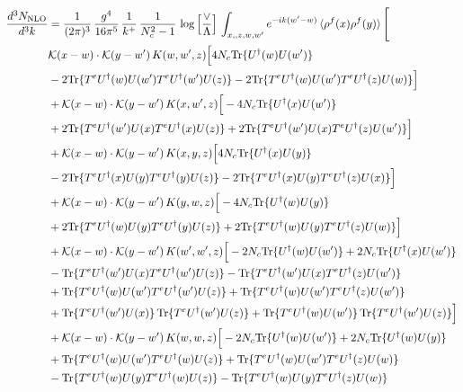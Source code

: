 \documentclass[9pt]{article}
\numberwithin{equation}{section}
\begin{document}
\begin{align}
    \frac{d^{3}N_{\mathrm{NLO}}}{d^{3}k} & = \frac{1}{(2\pi)^{3}}\,\frac{g^{4}}{16\pi^{5}}\,\frac{1}{k^{+}}\,\frac{1}{N^{2}_{c}-1}\,\log\Big[\frac{\vee}{\Lambda}\Big]\,\int_{x,,z,w,w'}e^{-ik(w'-w)}\,\langle\rho^{f}(x)\rho^{f}(y) \rangle\,\Bigg[\notag \\ & \mathcal K(x-w)\cdot\mathcal K(y-w')\,K(w,w',z)\Big[4 N_{c}{\rm Tr}\{U^\dagger(w)U(w')\}\notag\\
&-2{\rm Tr}\{T^eU^\dagger(w)U(w')T^eU^\dagger(w')U(z)\}-2{\rm Tr}\{T^eU^\dagger(w)U(w')T^eU^\dagger(z)U(w)\}\Big]\notag\\
&+\mathcal K(x-w)\cdot\mathcal K(y-w')\,K(x,w',z)\Big[-4 N_{c}{\rm Tr}\{U^\dagger(x)U(w')\}\notag\\
&+2{\rm Tr}\{T^eU^\dagger(w')U(x)T^eU^\dagger(x)U(z)\}+2{\rm Tr}\{T^eU^\dagger(w')U(x)T^eU^\dagger(z)U(w')\}\Big]\notag\\
&+\mathcal K(x-w)\cdot\mathcal K(y-w')\,K(x,y,z)\Big[4 N_{c}{\rm Tr}\{U^\dagger(x)U(y)\}\notag\\
&-2{\rm Tr}\{T^eU^\dagger(x)U(y)T^eU^\dagger(y)U(z)\}-2{\rm Tr}\{T^eU^\dagger(x)U(y)T^eU^\dagger(z)U(x)\}\Big]\notag\\
&+\mathcal K(x-w)\cdot\mathcal K(y-w')\,K(y,w,z)\Big[-4 N_{c}{\rm Tr}\{U^\dagger(w)U(y)\}\notag\\
&+2{\rm Tr}\{T^eU^\dagger(w)U(y)T^eU^\dagger(y)U(z)\}+2{\rm Tr}\{T^eU^\dagger(w)U(y)T^eU^\dagger(z)U(w)\}\Big]\notag\\
&+\mathcal K(x-w)\cdot\mathcal K(y-w')\,K(w',w',z)\Big[-2 N_{c}{\rm Tr}\{U^\dagger(w)U(w')\}+2 N_{c}{\rm Tr}\{U^\dagger(x)U(w')\}\notag\\
&-{\rm Tr}\{T^eU^\dagger(w')U(x)T^eU^\dagger(w')U(z)\}-{\rm Tr}\{T^eU^\dagger(w')U(x)T^eU^\dagger(z)U(w')\}\notag\\
&+{\rm Tr}\{T^eU^\dagger(w)U(w')T^eU^\dagger(w')U(z)\}+{\rm Tr}\{T^eU^\dagger(w)U(w')T^eU^\dagger(z)U(w')\}\notag\\
&+{\rm Tr}\{T^eU^\dagger(w')U(x)\}\,{\rm Tr}\{T^eU^\dagger(w')U(z)\}+{\rm Tr}\{T^eU^\dagger(w)U(w')\}\,{\rm Tr}\{T^eU^\dagger(w')U(z)\}\Big]\notag\\
&+\mathcal K(x-w)\cdot\mathcal K(y-w')\,K(w,w,z)\Big[-2 N_{c}{\rm Tr}\{U^\dagger(w)U(w')\}+2 N_{c}{\rm Tr}\{U^\dagger(w)U(y)\}\notag\\
&+{\rm Tr}\{T^eU^\dagger(w)U(w')T^eU^\dagger(w)U(z)\}+{\rm Tr}\{T^eU^\dagger(w)U(w')T^eU^\dagger(z)U(w)\}\notag\\
&-{\rm Tr}\{T^eU^\dagger(w)U(y)T^eU^\dagger(w)U(z)\}-{\rm Tr}\{T^eU^\dagger(w)U(y)T^eU^\dagger(z)U(w)\}\notag\\

\end{align}
\end{document}
